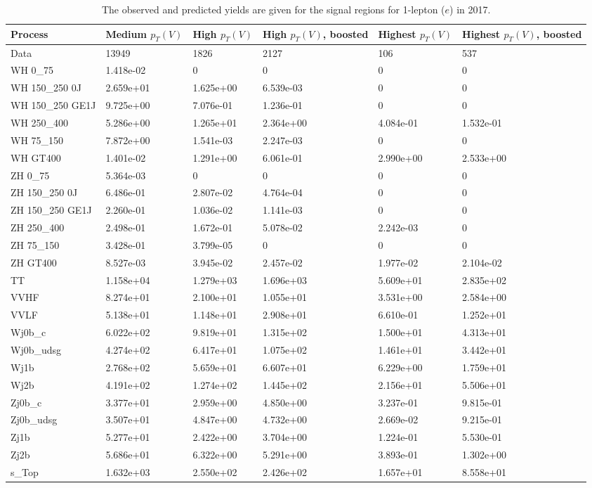 \begin{table}
\centering
\caption[2017 1-lepton ($e$) signal selection yields]{
                  The observed and predicted yields are given for the
                  signal regions for 1-lepton ($e$) in 2017.
                  }
{\footnotesize
\begin{tabularx}{\textwidth}{|X|X|X|X|X|X|}
\hline
Process & Medium $p_{T}(V)$ & High $p_{T}(V)$ & High $p_{T}(V)$, boosted & Highest $p_{T}(V)$ & Highest $p_{T}(V)$, boosted \\
\hline
Data & 13949 & 1826 & 2127 & 106 & 537 \\
\hline
WH 0\_75 & 1.418e-02 & 0 & 0 & 0 & 0 \\
WH 150\_250 0J & 2.659e+01 & 1.625e+00 & 6.539e-03 & 0 & 0 \\
WH 150\_250 GE1J & 9.725e+00 & 7.076e-01 & 1.236e-01 & 0 & 0 \\
WH 250\_400 & 5.286e+00 & 1.265e+01 & 2.364e+00 & 4.084e-01 & 1.532e-01 \\
WH 75\_150 & 7.872e+00 & 1.541e-03 & 2.247e-03 & 0 & 0 \\
WH GT400 & 1.401e-02 & 1.291e+00 & 6.061e-01 & 2.990e+00 & 2.533e+00 \\
ZH 0\_75 & 5.364e-03 & 0 & 0 & 0 & 0 \\
ZH 150\_250 0J & 6.486e-01 & 2.807e-02 & 4.764e-04 & 0 & 0 \\
ZH 150\_250 GE1J & 2.260e-01 & 1.036e-02 & 1.141e-03 & 0 & 0 \\
ZH 250\_400 & 2.498e-01 & 1.672e-01 & 5.078e-02 & 2.242e-03 & 0 \\
ZH 75\_150 & 3.428e-01 & 3.799e-05 & 0 & 0 & 0 \\
ZH GT400 & 8.527e-03 & 3.945e-02 & 2.457e-02 & 1.977e-02 & 2.104e-02 \\
\hline
TT & 1.158e+04 & 1.279e+03 & 1.696e+03 & 5.609e+01 & 2.835e+02 \\
VVHF & 8.274e+01 & 2.100e+01 & 1.055e+01 & 3.531e+00 & 2.584e+00 \\
VVLF & 5.138e+01 & 1.148e+01 & 2.908e+01 & 6.610e-01 & 1.252e+01 \\
Wj0b\_c & 6.022e+02 & 9.819e+01 & 1.315e+02 & 1.500e+01 & 4.313e+01 \\
Wj0b\_udsg & 4.274e+02 & 6.417e+01 & 1.075e+02 & 1.461e+01 & 3.442e+01 \\
Wj1b & 2.768e+02 & 5.659e+01 & 6.607e+01 & 6.229e+00 & 1.759e+01 \\
Wj2b & 4.191e+02 & 1.274e+02 & 1.445e+02 & 2.156e+01 & 5.506e+01 \\
Zj0b\_c & 3.377e+01 & 2.959e+00 & 4.850e+00 & 3.237e-01 & 9.815e-01 \\
Zj0b\_udsg & 3.507e+01 & 4.847e+00 & 4.732e+00 & 2.669e-02 & 9.215e-01 \\
Zj1b & 5.277e+01 & 2.422e+00 & 3.704e+00 & 1.224e-01 & 5.530e-01 \\
Zj2b & 5.686e+01 & 6.322e+00 & 5.291e+00 & 3.893e-01 & 1.302e+00 \\
s\_Top & 1.632e+03 & 2.550e+02 & 2.426e+02 & 1.657e+01 & 8.558e+01 \\
\hline
\end{tabularx}
}
\label{tab:sr-Wen-2017}
\end{table}

